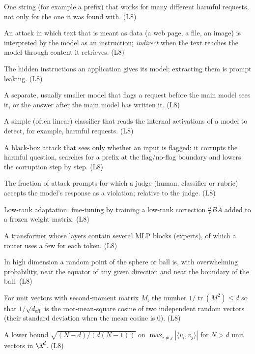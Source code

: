   \item[Universal jailbreak] One string (for example a prefix) that works for many different harmful requests, not only for the one it was found with. (L8)
  \item[Prompt injection] An attack in which text that is meant as data (a web page, a file, an image) is interpreted by the model as an instruction; \emph{indirect} when the text reaches the model through content it retrieves. (L8)
  \item[System prompt, prompt leaking] The hidden instructions an application gives its model; extracting them is prompt leaking. (L8)
  \item[Input / output classifier] A separate, usually smaller model that flags a request before the main model sees it, or the answer after the main model has written it. (L8)
  \item[Activation probe] A simple (often linear) classifier that reads the internal activations of a model to detect, for example, harmful requests. (L8)
  \item[Boundary point jailbreaking] A black-box attack that sees only whether an input is flagged: it corrupts the harmful question, searches for a prefix at the flag/no-flag boundary and lowers the corruption step by step. (L8)
  \item[Attack success rate] The fraction of attack prompts for which a judge (human, classifier or rubric) accepts the model's response as a violation; relative to the judge. (L8)
  \item[LoRA] Low-rank adaptation: fine-tuning by training a low-rank correction $\frac{\alpha}{r}BA$ added to a frozen weight matrix. (L8)
  \item[Mixture of experts] A transformer whose layers contain several MLP blocks (experts), of which a router uses a few for each token. (L8)
  \item[Concentration of measure] In high dimension a random point of the sphere or ball is, with overwhelming probability, near the equator of any given direction and near the boundary of the ball. (L8)
  \item[Effective dimension] For unit vectors with second-moment matrix $M$, the number $1/\operatorname{tr}(M^2)\le d$ so that $1/\sqrt{d_{\mathrm{eff}}}$ is the root-mean-square cosine of two independent random vectors (their standard deviation when the mean cosine is $0$). (L8)
  \item[Welch bound] A lower bound $\sqrt{(N-d)/(d(N-1))}$ on $\max_{i\neq j}|\langle v_i,v_j\rangle|$ for $N>d$ unit vectors in $\R^d$. (L8)
